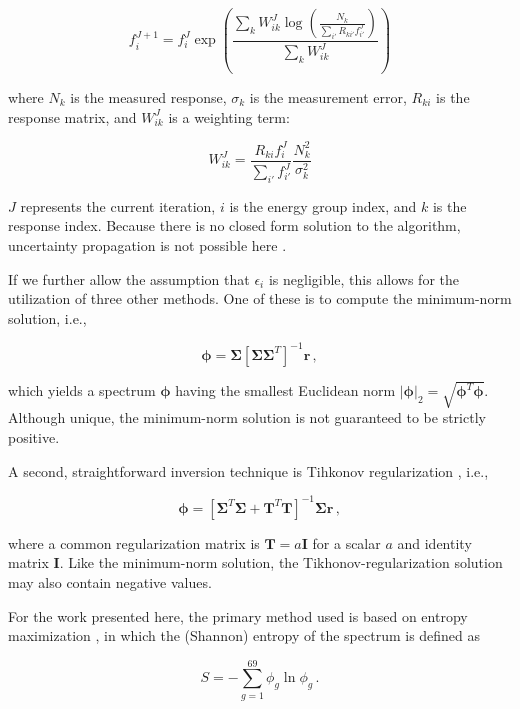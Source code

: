 \documentclass[journal]{IEEEtran}
\begin{document}
\begin{equation}
 f_i^{J+1} = f_i^{J} \exp(\frac{\sum_k W_{ik}^J \log(\frac{N_k}{\sum_{i'} R_{ki'}f_{i'}^J})}{\sum_k W_{ik}^J}) 
\label{eq:sand}
\end{equation}

where $N_k$ is the measured response, $\sigma_k$ is the measurement error, $R_{ki}$ is the response matrix, and $W_{ik}^J$ is a weighting term:

\begin{equation}
 W_{ik}^J = \frac{R_{ki} f_i^J}{\sum_{i'} f_{i'}^J} \frac{N_k^2}{\sigma_k^2} 
\label{eq:weighting}
\end{equation}

$J$ represents the current iteration, $i$ is the energy group index, and $k$ is the response index.
Because there is no closed form solution to the algorithm, uncertainty propagation is not possible here \cite{reginatto2004umg}.


If we further allow the assumption that $\epsilon_i$ is negligible, this allows for the utilization of three other methods.
One of these is to compute the minimum-norm solution, i.e.,

\begin{equation}
  \bm{\phi} =  \bm{\Sigma}  [\bm{\Sigma} \bm{\Sigma}^T]^{-1}\mathbf{r} \, ,
\end{equation}

which yields a spectrum $\bm{\phi}$ having the smallest Euclidean norm $|\bm{\phi}|_2 = \sqrt{\bm{\phi}^T\bm{\phi}}$.
Although unique, the minimum-norm solution is not guaranteed to be strictly positive.  


A second, straightforward inversion technique is Tihkonov regularization \cite{mueller2012lni}, i.e.,

\begin{equation}
 \bm{\phi} = [\bm{\Sigma}^T \bm{\Sigma}+ \mathbf{T}^T \mathbf{T}]^{-1} \bm{\Sigma} \mathbf{r} \, ,
\end{equation}

where a common regularization matrix is $\mathbf{T} = a\mathbf{I}$ for a scalar $a$ and identity matrix $\mathbf{I}$.
Like the minimum-norm solution, the Tikhonov-regularization solution may also contain negative values.

For the work presented here, the primary method used is based on entropy maximization \cite{itoh1989neutron}, in which the (Shannon) entropy of the spectrum is defined as

\begin{equation}
 S = -\sum^{69}_{g=1} \phi_g \ln \phi_g \, .
\label{eq:entropy}
\end{equation}
\end{document}
